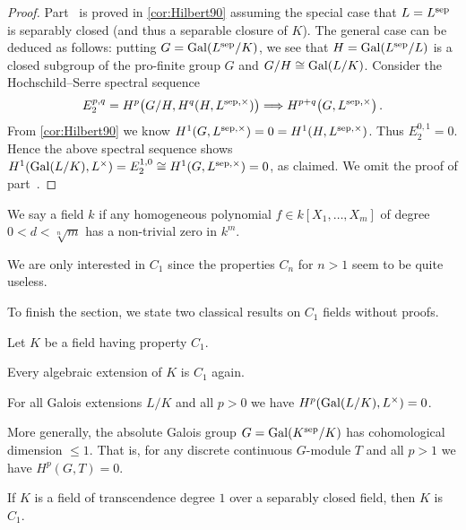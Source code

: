\documentclass[a4paper, 10pt, oneside, DIV=9, chapterprefix=true, numbers=enddot, bibliography=totoc]{scrbook}
\begin{document}
\begin{proof}
	Part~ is proved in \cref{cor:Hilbert90} assuming the special case that $L=L^{\mathrm{sep}}$ is separably closed (and thus a separable closure of $K$). The general case can be deduced as follows: putting $G=\operatorname{Gal}(L^{\mathrm{sep}}/K)$, we see that $H=\operatorname{Gal}(L^{\mathrm{sep}}/L)$ is a closed subgroup of the pro-finite group $G$ and $G/H\cong \operatorname{Gal}(L/K)$. Consider the Hochschild--Serre spectral sequence
	\begin{equation*}
		E_2^{p,q}=H^p\big(G/H,H^q(H,L^{\sep,\times})\big)\converge H^{p+q}\big(G,L^{\sep,\times}\big)\,.
	\end{equation*}
	From \cref{cor:Hilbert90} we know $H^1(G,L^{\mathrm{sep},\times})=0=H^1(H,L^{\mathrm{sep},\times})$. Thus $E_2^{0,1}=0$. Hence the above spectral sequence shows $H^1(\operatorname{Gal}(L/K),L^\times)=E_2^{1,0}\cong H^1(G,L^{\mathrm{sep},\times})=0$, as claimed. We omit the proof of part~.
\end{proof}
\begin{defi}
	We say a field $k$  if any homogeneous polynomial $f\in k[X_1,\dotsc,X_m]$ of degree $0<d<\sqrt[n]{m}$ has a non-trivial zero in $k^m$.
\end{defi}
\begin{rem}
	We are only interested in $C_1$ since the properties $C_n$ for $n>1$ seem to be quite useless.
\end{rem}
To finish the section, we state two classical results on $C_1$ fields without proofs.
\begin{prop}
	Let $K$ be a field having property $C_1$.
	\begin{alphanumerate}
		\item Every algebraic extension of $K$ is $C_1$ again.
		\item For all Galois extensions $L/K$ and all $p>0$ we have $H^p(\operatorname{Gal}(L/K),L^{\times})=0$.
		\item More generally, the absolute Galois group $G=\operatorname{Gal}(K^{\mathrm{sep}}/K)$ has cohomological dimension $\leq 1$. That is, for any discrete continuous $G$-module $T$ and all $p>1$ we have $H^p(G,T)=0$.
	\end{alphanumerate}
\end{prop}
\begin{prop}[Tsen]
	If $K$ is a field of transcendence degree $1$ over a separably closed field, then $K$ is $C_1$.
\end{prop}
\end{document}
